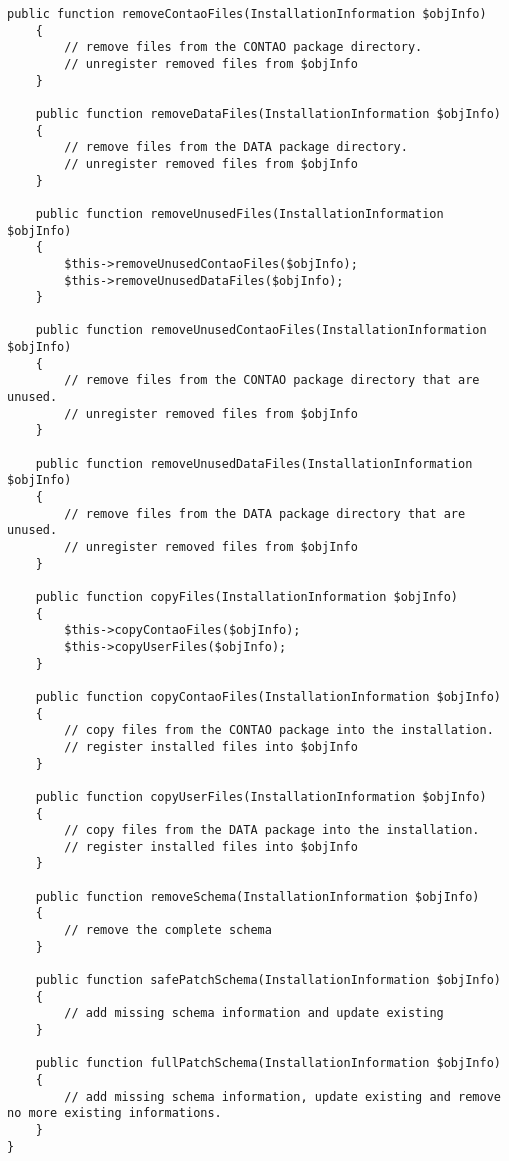 \begin{lstlisting}[caption=Basic Installer Implementation Code]
	public function removeContaoFiles(InstallationInformation $objInfo)
	{
		// remove files from the CONTAO package directory.
		// unregister removed files from $objInfo
	}
	
	public function removeDataFiles(InstallationInformation $objInfo)
	{
		// remove files from the DATA package directory.
		// unregister removed files from $objInfo
	}
	
	public function removeUnusedFiles(InstallationInformation $objInfo)
	{
		$this->removeUnusedContaoFiles($objInfo);
		$this->removeUnusedDataFiles($objInfo);
	}
	
	public function removeUnusedContaoFiles(InstallationInformation $objInfo)
	{
		// remove files from the CONTAO package directory that are unused.
		// unregister removed files from $objInfo
	}
	
	public function removeUnusedDataFiles(InstallationInformation $objInfo)
	{
		// remove files from the DATA package directory that are unused.
		// unregister removed files from $objInfo
	}
	
	public function copyFiles(InstallationInformation $objInfo)
	{
		$this->copyContaoFiles($objInfo);
		$this->copyUserFiles($objInfo);
	}
	
	public function copyContaoFiles(InstallationInformation $objInfo)
	{
		// copy files from the CONTAO package into the installation.
		// register installed files into $objInfo
	}
	
	public function copyUserFiles(InstallationInformation $objInfo)
	{
		// copy files from the DATA package into the installation.
		// register installed files into $objInfo
	}
	
	public function removeSchema(InstallationInformation $objInfo)
	{
		// remove the complete schema
	}
	
	public function safePatchSchema(InstallationInformation $objInfo)
	{
		// add missing schema information and update existing
	}
	
	public function fullPatchSchema(InstallationInformation $objInfo)
	{
		// add missing schema information, update existing and remove no more existing informations.
	}
}
\end{lstlisting}
